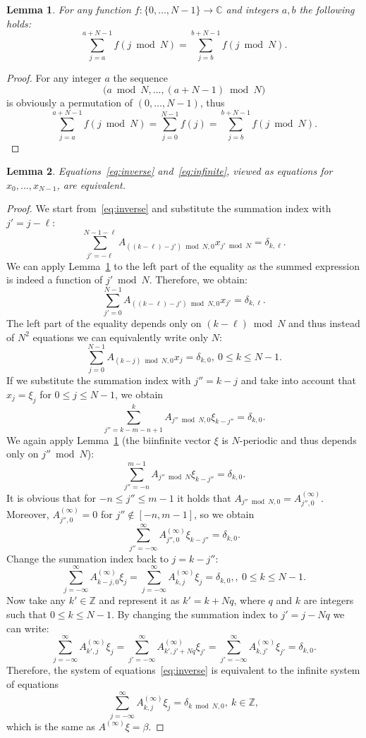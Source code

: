 \documentclass{article}
\newtheorem{lemma}{Lemma}
\begin{document}
	\begin{lemma}\label{lm:sum-shift}
	For any function $f:\{0,\dots,N-1\}\to \mathbb{C}$ and integers  $a,b$ the following holds:
	\[
	\sum_{j=a}^{a+N-1} f(j \bmod N) = \sum_{j=b}^{b+N-1} f(j \bmod N).
	\]
	\end{lemma}
	\begin{proof}
	For any integer $a$ the sequence 
	\[
	\Big(a \bmod N, \dots, (a+N-1) \bmod N\Big)
	\]
	is obviously a permutation of $(0,\dots, N-1)$, thus
	\[
	\sum_{j=a}^{a+N-1} f(j \bmod N) = \sum_{j=0}^{N-1} f(j) = \sum_{j=b}^{b+N-1} f(j \bmod N).
	\]
	\end{proof}
	
	\begin{lemma}\label{lm:equivalent}
	Equations~\eqref{eq:inverse} and~\eqref{eq:infinite}, viewed as equations for $x_0,\dots,x_{N-1}$, are equivalent.
	\end{lemma}
	\begin{proof}
	We start from~\eqref{eq:inverse} and substitute the summation index with $j' = j - \ell$:
	\[
    \sum_{j'=-\ell}^{N-1-\ell} A_{((k-\ell)- j') \bmod N, 0} x_{j'\bmod N}
	=
	\delta_{k,\ell}.
	\]
	We can apply Lemma~\ref{lm:sum-shift} to the left part of the equality as the summed expression is indeed a function of $j' \bmod N$.
    Therefore, we obtain:
	\[
	\sum_{j'=0}^{N-1} A_{((k-\ell)- j') \bmod N, 0} x_{j'}
	=
	\delta_{k,\ell}.
	\]
	The left part of the equality depends only on $(k-\ell) \bmod N$ and thus instead of $N^2$ equations we can equivalently write only $N$:
	\[
	\sum_{j=0}^{N-1} A_{(k-j) \bmod N, 0} x_j
	=
	\delta_{k,0},~ 0\le k \le N-1.
	\]
	If we substitute the summation index with $j'' = k-j$ and take into account that $x_j = \xi_{j}$ for $0\le j \le N-1$, we obtain
	\[
	\sum_{j''=k-m-n+1}^{k} A_{j'' \bmod N, 0} \xi_{k-j''} = \delta_{k,0}.
	\]
	We again apply Lemma~\ref{lm:sum-shift} (the biinfinite vector $\xi$  is $N$-periodic and thus depends only on $j'' \bmod N$):
	\[
	\sum_{j''=-n}^{m-1}A_{j'' \bmod N}\xi_{k-j''} = \delta_{k,0}.
	\]
	It is obvious that for $-n \le j'' \le m-1$ it holds that $A_{j'' \bmod N,0} = A^{(\infty)}_{j'', 0}$.
	Moreover, $A^{(\infty)}_{j'', 0} = 0$ for $j'' \not\in [-n,m-1]$, so we obtain
	\[
	\sum_{j''=-\infty}^{\infty}A^{(\infty)}_{j'',0}\xi_{k-j''} = \delta_{k,0}.
	\]
	Change the summation index back to $j = k-j''$:
	\[
	\sum_{j=-\infty}^{\infty}A^{(\infty)}_{k-j,0}\xi_{j}
	=
	\sum_{j=-\infty}^{\infty}A^{(\infty)}_{k,j}\xi_{j}
	=
	\delta_{k,0},
	,~ 0\le k \le N-1.
	\]
	Now take any $k' \in \mathbb{Z}$ and represent it as $k' = k + Nq$, where $q$ and $k$ are integers such that $0 \le k \le N-1$.
	By changing the summation index to $j' = j - Nq$ we can write:
	\[
	\sum_{j=-\infty}^{\infty}A^{(\infty)}_{k',j}\xi_{j}
    =
    \sum_{j'=-\infty}^{\infty}A^{(\infty)}_{k',j'+Nq}\xi_{j'}
    =
    \sum_{j'=-\infty}^{\infty}A^{(\infty)}_{k,j'}\xi_{j'}
    =
    \delta_{k,0}.
    \]
    Therefore, the system of equations~\eqref{eq:inverse} is equivalent to the infinite system of equations
    \[
    \sum_{j=-\infty}^{\infty}A^{(\infty)}_{k,j}\xi_{j} = \delta_{k\bmod N,0},~k\in\mathbb{Z},
    \]
    which is the same as $A^{(\infty)}\xi = \beta$.
	\end{proof}
	
\end{document}

